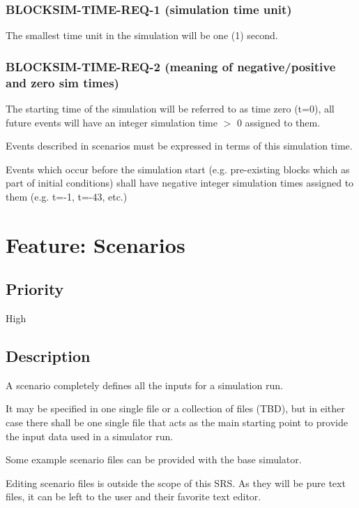 \documentclass{scrreprt}
\begin{document}
\subsubsection{BLOCKSIM-TIME-REQ-1 (simulation time unit)}

The smallest time unit in the simulation will be one (1) second.

\subsubsection{BLOCKSIM-TIME-REQ-2 (meaning of negative/positive and zero sim times)}

The starting time of the simulation will be referred to as time zero
(t=0), all future events will have an integer simulation time $>$ 0
assigned to them.

Events described in scenarios must be expressed in terms of this
simulation time.

Events which occur before the simulation start (e.g. pre-existing blocks
which as part of initial conditions) shall have negative integer simulation
times assigned to them (e.g. t=-1, t=-43, etc.)



\section{Feature: Scenarios}

\subsection{Priority}

High


\subsection{Description}

A scenario completely defines all the inputs for a simulation run.

It may be specified in one single file or a collection of files (TBD),
but in either case there shall be one single file that acts as the
main starting point to provide the input data used in a simulator run.

Some example scenario files can be provided with the base simulator.

Editing scenario files is outside the scope of this SRS. As they will be pure
text files, it can be left to the user and their favorite text editor.
\end{document}
